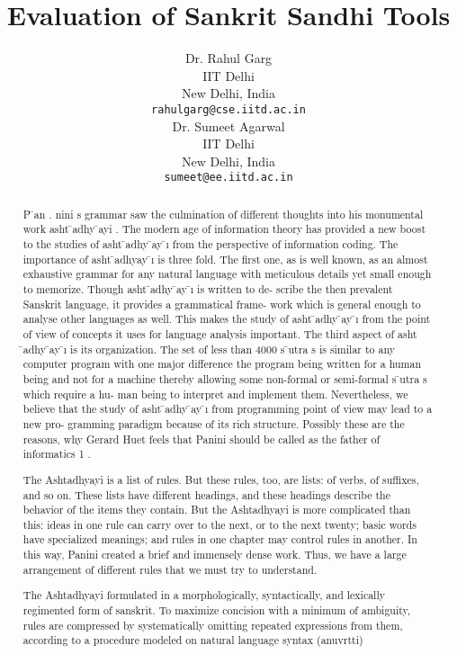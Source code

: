 \documentclass[11pt]{article}
\title{Evaluation of Sankrit Sandhi Tools}
\author{Dr. Rahul Garg \\
 IIT Delhi \\
  New Delhi, India \\
  {\tt rahulgarg@cse.iitd.ac.in} \\\And
  Dr. Sumeet Agarwal \\
  IIT Delhi \\
 New Delhi, India \\
  {\tt sumeet@ee.iitd.ac.in} \\}
\date{}
\begin{document}
\maketitle
\begin{abstract}
	
	P ̄an . nini s grammar saw the culmination of different thoughts into his monumental work asht ̄adhy ̄ayi . The modern age of information theory has provided a new boost to the studies of asht ̄adhy ̄ay ̄ı from the perspective of information coding. The importance of asht ̄adhyay ̄ı is three fold. The first one, as is well known, as an almost exhaustive grammar for any natural language with meticulous details yet small enough to memorize. Though asht ̄adhy ̄ay ̄ı is written to de- scribe the then prevalent Sanskrit language, it provides a grammatical frame- work which is general enough to analyse other languages as well. This makes the study of asht ̄adhy ̄ay ̄ı from the point of view of concepts it uses for language analysis important. The third aspect of asht ̄adhy ̄ay ̄ı is its organization. The set of less than 4000 s ̄utra s is similar to any computer program with one major difference the program being written for a human being and not for a machine thereby allowing some non-formal or semi-formal s ̄utra s which require a hu- man being to interpret and implement them. Nevertheless, we believe that the study of asht ̄adhy ̄ay ̄ı from programming point of view may lead to a new pro- gramming paradigm because of its rich structure. Possibly these are the reasons, why Gerard Huet feels that Panini should be called as the father of informatics 1 .
	
	
	The Ashtadhyayi is a list of rules. But these rules, too, are lists: of verbs, of suffixes, and so on. These lists have different headings, and these headings describe the behavior of the items they contain. But the Ashtadhyayi is more complicated than this: ideas in one rule can carry over to the next, or to the next twenty; basic words have specialized meanings; and rules in one chapter may control rules in another. In this way, Panini created a brief and immensely dense work. Thus, we have a large arrangement of different rules that we must try to understand.
	
	
	The Ashtadhyayi formulated in a morphologically, syntactically, and lexically regimented form of sanskrit. To maximize concision with a minimum of ambiguity, rules are compressed by systematically omitting repeated expressions from them, according to a procedure modeled on natural language syntax (anuvrtti)
	

\end{abstract}
\end{document}
